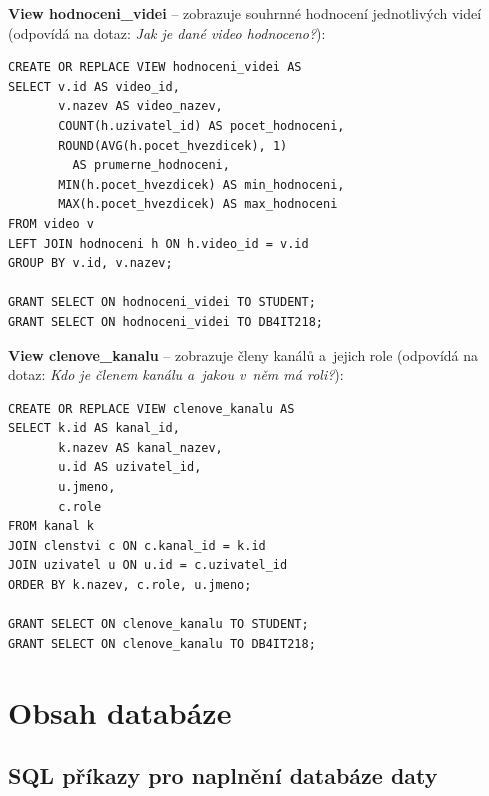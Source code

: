 \documentclass[12pt,a4paper]{article}
\begin{document}
\textbf{View hodnoceni\_videi} -- zobrazuje souhrnné hodnocení jednotlivých videí
(odpovídá na dotaz: \emph{Jak je dané video hodnoceno?}):

\begin{lstlisting}
CREATE OR REPLACE VIEW hodnoceni_videi AS
SELECT v.id AS video_id,
       v.nazev AS video_nazev,
       COUNT(h.uzivatel_id) AS pocet_hodnoceni,
       ROUND(AVG(h.pocet_hvezdicek), 1)
         AS prumerne_hodnoceni,
       MIN(h.pocet_hvezdicek) AS min_hodnoceni,
       MAX(h.pocet_hvezdicek) AS max_hodnoceni
FROM video v
LEFT JOIN hodnoceni h ON h.video_id = v.id
GROUP BY v.id, v.nazev;

GRANT SELECT ON hodnoceni_videi TO STUDENT;
GRANT SELECT ON hodnoceni_videi TO DB4IT218;
\end{lstlisting}

\textbf{View clenove\_kanalu} -- zobrazuje členy kanálů a~jejich role
(odpovídá na dotaz: \emph{Kdo je členem kanálu a~jakou v~něm má roli?}):

\begin{lstlisting}
CREATE OR REPLACE VIEW clenove_kanalu AS
SELECT k.id AS kanal_id,
       k.nazev AS kanal_nazev,
       u.id AS uzivatel_id,
       u.jmeno,
       c.role
FROM kanal k
JOIN clenstvi c ON c.kanal_id = k.id
JOIN uzivatel u ON u.id = c.uzivatel_id
ORDER BY k.nazev, c.role, u.jmeno;

GRANT SELECT ON clenove_kanalu TO STUDENT;
GRANT SELECT ON clenove_kanalu TO DB4IT218;
\end{lstlisting}

\newpage

\section{Obsah databáze}

\subsection{SQL příkazy pro naplnění databáze daty}
\label{sec:insert}
\end{document}
